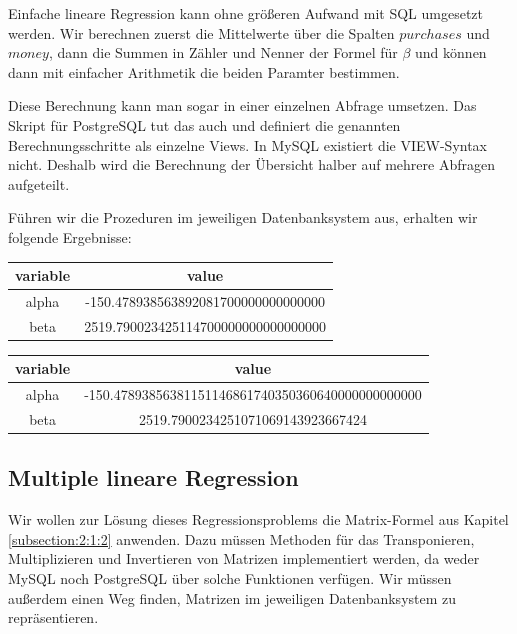 Einfache lineare Regression kann ohne größeren Aufwand mit SQL umgesetzt werden. Wir berechnen zuerst die Mittelwerte über die Spalten $purchases$ und $money$, dann die Summen in Zähler und Nenner der Formel für $\beta$ und können dann mit einfacher Arithmetik die beiden Paramter bestimmen.

Diese Berechnung kann man sogar in einer einzelnen Abfrage umsetzen. Das Skript für PostgreSQL tut das auch und definiert die genannten Berechnungsschritte als einzelne Views. In MySQL existiert die VIEW-Syntax nicht. Deshalb wird die Berechnung der Übersicht halber auf mehrere Abfragen aufgeteilt.

Führen wir die Prozeduren im jeweiligen Datenbanksystem aus, erhalten wir folgende Ergebnisse:

\begin{center}
  \begin{tabular}{|c|c|}\hline
    \textbf{variable} & \textbf{value} \\ \hline
    alpha & -150.478938563892081700000000000000 \\ \hline
    beta & 2519.790023425114700000000000000000 \\ \hline
  \end{tabular}

  \begin{tabular}{|c|c|}\hline
    \textbf{variable} & \textbf{value} \\ \hline
    alpha & -150.47893856381151146861740350360640000000000000 \\ \hline
    beta & 2519.7900234251071069143923667424 \\ \hline
  \end{tabular}
\end{center}

\subsection{Multiple lineare Regression}
\label{subsection:3:4:2}

Wir wollen zur Lösung dieses Regressionsproblems die Matrix-Formel aus Kapitel \ref{subsection:2:1:2} anwenden. Dazu müssen Methoden für das Transponieren, Multiplizieren und Invertieren von Matrizen implementiert werden, da weder MySQL noch PostgreSQL über solche Funktionen verfügen. Wir müssen außerdem einen Weg finden, Matrizen im jeweiligen Datenbanksystem zu repräsentieren.

